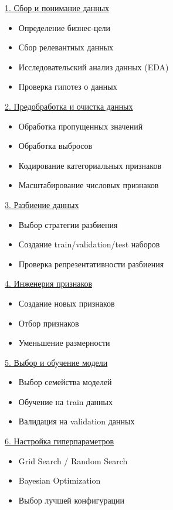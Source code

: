 \underline{1. Сбор и понимание данных}
\begin{itemize}
    \item Определение бизнес-цели
    \item Сбор релевантных данных
    \item Исследовательский анализ данных (EDA)
    \item Проверка гипотез о данных
\end{itemize}

\underline{2. Предобработка и очистка данных}
\begin{itemize}
    \item Обработка пропущенных значений
    \item Обработка выбросов
    \item Кодирование категориальных признаков
    \item Масштабирование числовых признаков
\end{itemize}

\underline{3. Разбиение данных}
\begin{itemize}
    \item Выбор стратегии разбиения
    \item Создание train/validation/test наборов
    \item Проверка репрезентативности разбиения
\end{itemize}

\underline{4. Инженерия признаков}
\begin{itemize}
    \item Создание новых признаков
    \item Отбор признаков
    \item Уменьшение размерности
\end{itemize}

\underline{5. Выбор и обучение модели}
\begin{itemize}
    \item Выбор семейства моделей
    \item Обучение на train данных
    \item Валидация на validation данных
\end{itemize}

\underline{6. Настройка гиперпараметров}
\begin{itemize}
    \item Grid Search / Random Search
    \item Bayesian Optimization
    \item Выбор лучшей конфигурации
\end{itemize}

